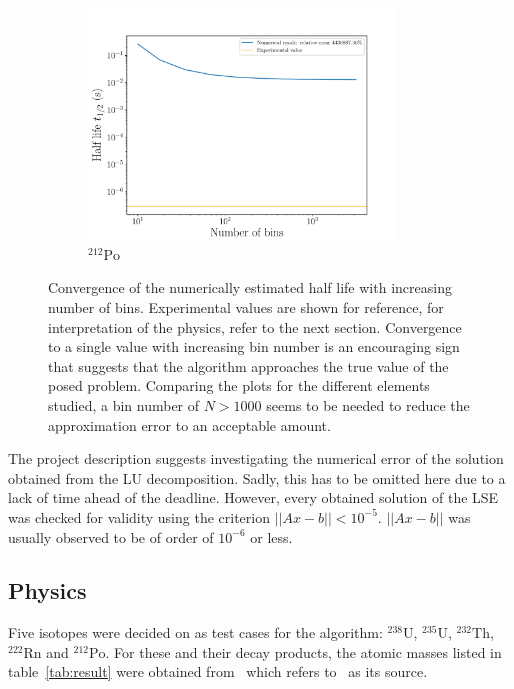 \documentclass[a4paper,DIV=12,english]{scrartcl}
\begin{document}
\begin{figure}
\begin{subfigure}{0.49\textwidth}
        \includegraphics[width=0.9\textwidth]{../plots/bin_dependence/bins_po212.pdf}
        \caption{$^{212}\text{Po}$}
        \label{subfig:bins_po212}
    \end{subfigure}
    \caption{Convergence of the numerically estimated half life with increasing number of bins. Experimental values are shown for reference, for interpretation of the physics, refer to the next section. Convergence to a single value with increasing bin number is an encouraging sign that suggests that the algorithm approaches the true value of the posed problem. Comparing the plots for the different elements studied, a bin number of $N > 1000$ seems to be needed to reduce the approximation error to an acceptable amount.}
    \label{fig:binsize}
\end{figure}

The project description suggests investigating the numerical error of the solution obtained from the LU decomposition. Sadly, this has to be omitted here due to a lack of time ahead of the deadline. However, every obtained solution of the LSE was checked for validity using the criterion $||Ax - b|| < 10^{-5}$. $||Ax - b||$ was usually observed to be of order of $10^{-6}$ or less.

\subsection{Physics}
Five isotopes were decided on as test cases for the algorithm: $^{238}\text{U}$, $^{235}\text{U}$, $^{232}\text{Th}$, $^{222}\text{Rn}$ and $^{212}\text{Po}$. For these and their decay products, the atomic masses listed in table~\ref{tab:result} were obtained from~\cite{Wolfram} which refers to~\cite{Audi} as its source.
\end{document}
